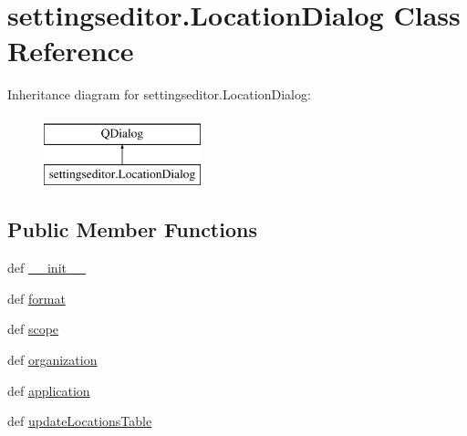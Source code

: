 \hypertarget{classsettingseditor_1_1LocationDialog}{}\section{settingseditor.\+Location\+Dialog Class Reference}
\label{classsettingseditor_1_1LocationDialog}
Inheritance diagram for settingseditor.\+Location\+Dialog\+:\begin{figure}[H]
\begin{center}
\leavevmode
\includegraphics[height=2.000000cm]{classsettingseditor_1_1LocationDialog}
\end{center}
\end{figure}
\subsection*{Public Member Functions}
\begin{DoxyCompactItemize}
\item 
def \hyperlink{classsettingseditor_1_1LocationDialog_a51a27b873fe1360834cc40112c14ed66}{\+\_\+\+\_\+init\+\_\+\+\_\+}
\item 
def \hyperlink{classsettingseditor_1_1LocationDialog_af1c17953836ba48331c002ce321e2c81}{format}
\item 
def \hyperlink{classsettingseditor_1_1LocationDialog_af326b9af8524b9ae3a39ec49d6d12088}{scope}
\item 
def \hyperlink{classsettingseditor_1_1LocationDialog_a331e2bac519caddb48ce473bb2aff17e}{organization}
\item 
def \hyperlink{classsettingseditor_1_1LocationDialog_a0dd50118ebe269321ad30ab2d5151b09}{application}
\item 
def \hyperlink{classsettingseditor_1_1LocationDialog_a98164e9dffe91a84100ced79f237e8ef}{update\+Locations\+Table}
\end{DoxyCompactItemize}
